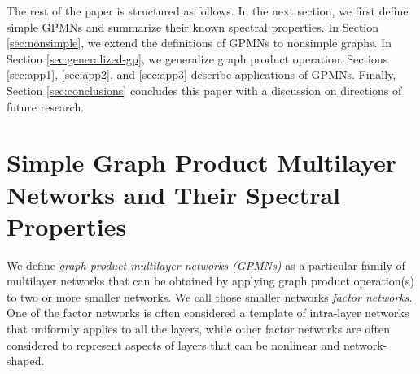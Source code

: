 \documentclass{article}
\begin{document}
The rest of the paper is structured as follows. In the next section,
we first define simple GPMNs and summarize their known spectral
properties. In Section \ref{sec:nonsimple}, we extend the definitions
of GPMNs to nonsimple graphs. In Section \ref{sec:generalized-gp}, we
generalize graph product operation. Sections \ref{sec:app1},
\ref{sec:app2}, and \ref{sec:app3} describe applications of
GPMNs. Finally, Section \ref{sec:conclusions} concludes this paper
with a discussion on directions of future research.

\section{Simple Graph Product Multilayer Networks and Their Spectral Properties}
\label{sec:simple}

We define {\em graph product multilayer networks (GPMNs)} as a
particular family of multilayer networks that can be obtained by
applying graph product operation(s) to two or more smaller
networks. We call those smaller networks {\em factor networks}. One of
the factor networks is often considered a template of intra-layer
networks that uniformly applies to all the layers, while other factor
networks are often considered to represent aspects of layers
\cite{kivela2014multilayer} that can be nonlinear and network-shaped.
\end{document}
